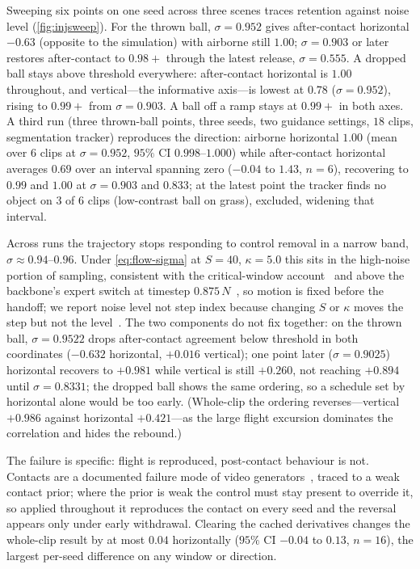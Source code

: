 Sweeping six points on one seed across three scenes traces retention against noise level (\cref{fig:injsweep}). For the thrown ball, $\sigma=0.952$ gives after-contact horizontal $-0.63$ (opposite to the simulation) with airborne still $1.00$; $\sigma=0.903$ or later restores after-contact to $0.98{+}$ through the latest release, $\sigma=0.555$. A dropped ball stays above threshold everywhere: after-contact horizontal is $1.00$ throughout, and vertical---the informative axis---is lowest at $0.78$ ($\sigma=0.952$), rising to $0.99{+}$ from $\sigma=0.903$. A ball off a ramp stays at $0.99{+}$ in both axes. A third run (three thrown-ball points, three seeds, two guidance settings, $18$ clips, segmentation tracker) reproduces the direction: airborne horizontal $1.00$ (mean over $6$ clips at $\sigma=0.952$, $95\%$ CI $0.998$--$1.000$) while after-contact horizontal averages $0.69$ over an interval spanning zero ($-0.04$ to $1.43$, $n=6$), recovering to $0.99$ and $1.00$ at $\sigma=0.903$ and $0.833$; at the latest point the tracker finds no object on $3$ of $6$ clips (low-contrast ball on grass), excluded, widening that interval.

Across runs the trajectory stops responding to control removal in a narrow band, $\sigma \approx 0.94$--$0.96$. Under \cref{eq:flow-sigma} at $S=40$, $\kappa=5.0$ this sits in the high-noise portion of sampling, consistent with the critical-window account~\cite{phasetrans2024,dynregimes2024,critwindows2024} and above the backbone's expert switch at timestep $0.875\,N$~\cite{wan22dual2026}, so motion is fixed before the handoff; we report noise level not step index because changing $S$ or $\kappa$ moves the step but not the level~\cite{sdedit2022,p2train2022}. The two components do not fix together: on the thrown ball, $\sigma=0.9522$ drops after-contact agreement below threshold in both coordinates ($-0.632$ horizontal, $+0.016$ vertical); one point later ($\sigma=0.9025$) horizontal recovers to $+0.981$ while vertical is still $+0.260$, not reaching $+0.894$ until $\sigma=0.8331$; the dropped ball shows the same ordering, so a schedule set by horizontal alone would be too early. (Whole-clip the ordering reverses---vertical $+0.986$ against horizontal $+0.421$---as the large flight excursion dominates the correlation and hides the rebound.)

The failure is specific: flight is reproduced, post-contact behaviour is not. Contacts are a documented failure mode of video generators~\cite{videophy2024}, traced to a weak contact prior; where the prior is weak the control must stay present to override it, so applied throughout it reproduces the contact on every seed and the reversal appears only under early withdrawal. Clearing the cached derivatives changes the whole-clip result by at most $0.04$ horizontally ($95\%$ CI $-0.04$ to $0.13$, $n=16$), the largest per-seed difference on any window or direction.

